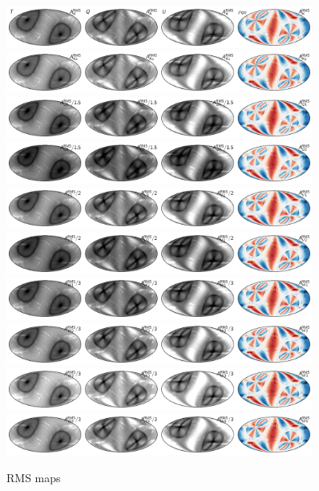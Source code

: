 \documentclass[twocolumn]{../../common/aa}
\begin{document}
\begin{figure}[p]
	\centering
	\includegraphics[width=0.9\textwidth]{figures/023-WMAP_K_rms.pdf}
	\includegraphics[width=0.9\textwidth]{figures/030-WMAP_Ka_rms.pdf}
	\includegraphics[width=0.9\textwidth]{figures/040-WMAP_Q1_rms.pdf}
	\includegraphics[width=0.9\textwidth]{figures/040-WMAP_Q2_rms.pdf}
	\includegraphics[width=0.9\textwidth]{figures/060-WMAP_V1_rms.pdf}
	\includegraphics[width=0.9\textwidth]{figures/060-WMAP_V2_rms.pdf}
	\includegraphics[width=0.9\textwidth]{figures/090-WMAP_W1_rms.pdf}
	\includegraphics[width=0.9\textwidth]{figures/090-WMAP_W2_rms.pdf}
	\includegraphics[width=0.9\textwidth]{figures/090-WMAP_W3_rms.pdf}
	\includegraphics[width=0.9\textwidth]{figures/090-WMAP_W4_rms.pdf}
	\caption{RMS maps}
        \label{fig:rms}
\end{figure}
\end{document}
